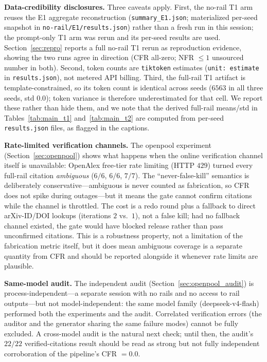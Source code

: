 \documentclass[10pt,twocolumn]{article}
\begin{document}
\textbf{Data-credibility disclosures.} Three caveats apply. First, the no-rail T1 arm reuses the E1 aggregate reconstruction (\texttt{summary\_E1.json}; materialized per-seed snapshot in \texttt{no-rail/E1/results.json}) rather than a fresh run in this session; the prompt-only T1 arm was rerun and its per-seed results are used. Section~\ref{sec:repro} reports a full no-rail T1 rerun as reproduction evidence, showing the two runs agree in direction (CFR all-zero; NFR $\leq 1$ unsourced number in both). Second, token counts are \texttt{tiktoken} estimates (\texttt{unit: estimate} in \texttt{results.json}), not metered API billing. Third, the full-rail T1 artifact is template-constrained, so its token count is identical across seeds ($6563$ in all three seeds, std $0.0$); token variance is therefore underestimated for that cell. We report these rather than hide them, and we note that the derived full-rail means/std in Tables~\ref{tab:main_t1} and~\ref{tab:main_t2} are computed from per-seed \texttt{results.json} files, as flagged in the captions.

\textbf{Rate-limited verification channels.} The openpool experiment (Section~\ref{sec:openpool}) shows what happens when the online verification channel itself is unavailable: OpenAlex free-tier rate limiting (HTTP $429$) turned every full-rail citation \emph{ambiguous} ($6/6$, $6/6$, $7/7$). The ``never-false-kill'' semantics is deliberately conservative---ambiguous is never counted as fabrication, so CFR does not spike during outages---but it means the gate cannot confirm citations while the channel is throttled. The cost is a redo round plus a fallback to direct arXiv-ID/DOI lookups (iterations $2$ vs.\ $1$), not a false kill; had no fallback channel existed, the gate would have blocked release rather than pass unconfirmed citations. This is a robustness property, not a limitation of the fabrication metric itself, but it does mean ambiguous coverage is a separate quantity from CFR and should be reported alongside it whenever rate limits are plausible.

\textbf{Same-model audit.} The independent audit (Section~\ref{sec:openpool_audit}) is process-independent---a separate session with no rails and no access to rail outputs---but not model-independent: the same model family (deepseek-v4-flash) performed both the experiments and the audit. Correlated verification errors (the auditor and the generator sharing the same failure modes) cannot be fully excluded. A cross-model audit is the natural next check; until then, the audit's $22/22$ verified-citations result should be read as strong but not fully independent corroboration of the pipeline's CFR $= 0.0$.
\end{document}
